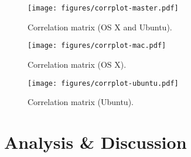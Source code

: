 \documentclass[12pt,letterpaper]{article}
\begin{document}
		\begin{figure}[H]
			\centerline{\texttt{[image: figures/corrplot-master.pdf]}}
			\caption{Correlation matrix (OS X and Ubuntu).}
			\label{fig:corrplot}
		\end{figure}

		\begin{figure}[H]
			\centerline{\texttt{[image: figures/corrplot-mac.pdf]}}
			\caption{Correlation matrix (OS X).}
			\label{fig:corrplot-mac}
		\end{figure}


		\begin{figure}[H]
			\centerline{\texttt{[image: figures/corrplot-ubuntu.pdf]}}
			\caption{Correlation matrix (Ubuntu).}
			\label{fig:corrplot-ubuntu}
		\end{figure}

	\section{Analysis \& Discussion}


	\clearpage
	\printbibliography
\end{document}
